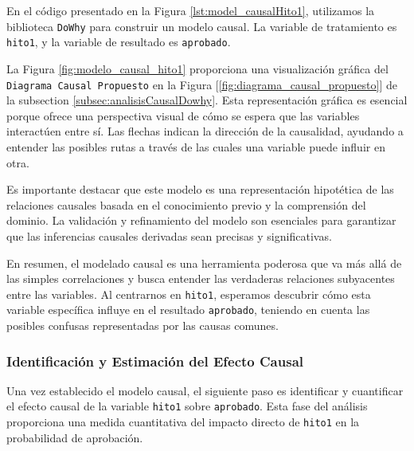 En el código presentado en la Figura \ref{lst:model_causalHito1}, utilizamos la biblioteca \texttt{DoWhy} para construir un modelo causal. La variable de tratamiento es \texttt{hito1}, y la variable de resultado es \texttt{aprobado}. 

La Figura \ref{fig:modelo_causal_hito1} proporciona una visualización gráfica del \texttt{Diagrama Causal Propuesto} en la Figura  [\ref{fig:diagrama_causal_propuesto}] de la subsection \ref{subsec:analisisCausalDowhy}. Esta representación gráfica es esencial porque ofrece una perspectiva visual de cómo se espera que las variables interactúen entre sí. Las flechas indican la dirección de la causalidad, ayudando a entender las posibles rutas a través de las cuales una variable puede influir en otra.

Es importante destacar que este modelo es una representación hipotética de las relaciones causales basada en el conocimiento previo y la comprensión del dominio. La validación y refinamiento del modelo son esenciales para garantizar que las inferencias causales derivadas sean precisas y significativas.

En resumen, el modelado causal es una herramienta poderosa que va más allá de las simples correlaciones y busca entender las verdaderas relaciones subyacentes entre las variables. Al centrarnos en \texttt{hito1}, esperamos descubrir cómo esta variable específica influye en el resultado \texttt{aprobado}, teniendo en cuenta las posibles confusas representadas por las causas comunes.


\subsubsection{Identificación y Estimación del Efecto Causal}

Una vez establecido el modelo causal, el siguiente paso es identificar y cuantificar el efecto causal de la variable \texttt{hito1} sobre \texttt{aprobado}. Esta fase del análisis proporciona una medida cuantitativa del impacto directo de \texttt{hito1} en la probabilidad de aprobación.

